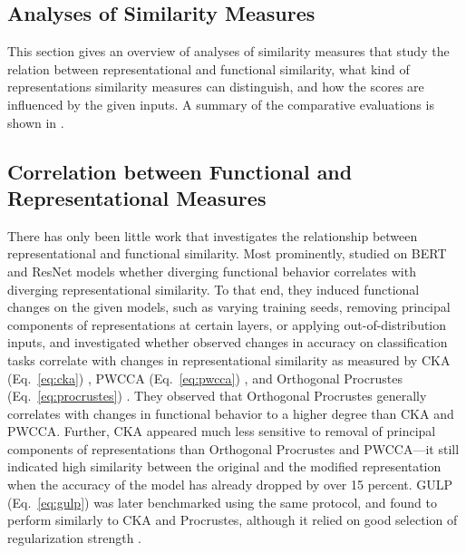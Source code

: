 \documentclass{article}
\newcommand{\citet}{\textcite}
\newcommand\myeqref[1]{%
    (\textup{Eq.~\ref{#1}})%
}
\begin{document}
\begin{refsegment}
\section{Analyses of Similarity Measures} \label{ap:analyses}
This section gives an overview of analyses of similarity measures that study the relation between representational and functional similarity, what kind of representations similarity measures can distinguish, and how the scores are influenced by the given inputs.
A summary of the comparative evaluations is shown in .


\subsection{Correlation between Functional and Representational Measures}\label{sec:corr_repfuncsim}

\hypertarget{test:ding}{}
There has only been little work that investigates the relationship between representational and functional similarity.
Most prominently, \citet{ding_grounding_2021} studied on BERT \cite{devlin_bert_2019} and ResNet \cite{he_deep_2015} models whether diverging functional behavior correlates with diverging representational similarity.
To that end, they induced functional changes on the given models, such as varying training seeds, removing principal components of representations at certain layers, or applying out-of-distribution inputs, and investigated whether observed changes in accuracy on classification tasks correlate with changes in representational similarity as measured by CKA \myeqref{eq:cka}, PWCCA \myeqref{eq:pwcca}, and Orthogonal Procrustes \myeqref{eq:procrustes}.
They observed that Orthogonal Procrustes generally correlates with changes in functional behavior to a higher degree than CKA and PWCCA.
Further, CKA appeared much less sensitive to removal of principal components of representations than Orthogonal Procrustes and PWCCA---it still indicated high similarity between the original and the modified representation when the accuracy of the model has already dropped by over 15 percent.
GULP \myeqref{eq:gulp} was later benchmarked using the same protocol, and found to perform similarly to CKA and Procrustes, although it relied on good selection of regularization strength \cite{boix-adsera_gulp_2022}.


\end{refsegment}
\end{document}
